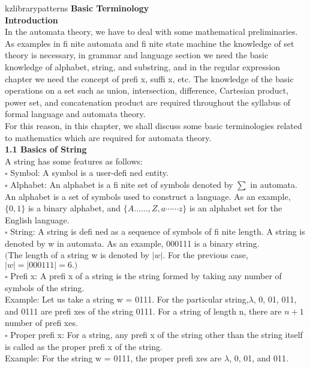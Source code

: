 \documentclass[12pt,a4paper]{book}
\begin{document}
\setlength{\parskip}{5mm}kzlibrary{patterns}
\textbf{\large{Basic Terminology}} \\
\textbf{Introduction} \\
In the automata theory, we have to deal with some mathematical preliminaries. As examples in fi nite
automata and fi nite state machine the knowledge of set theory is necessary, in grammar and language
section we need the basic knowledge of alphabet, string, and substring, and in the regular expression
chapter we need the concept of prefi x, suffi x, etc. The knowledge of the basic operations on a set such
as union, intersection, difference, Cartesian product, power set, and concatenation product are required
throughout the syllabus of formal language and automata theory.\\
For this reason, in this chapter, we shall discuss some basic terminologies related to mathematics
which are required for automata theory.\\
\textbf{1.1 Basics of String}\\ 
A string has some features as follows:\\
$\square$ Symbol: A symbol is a user-defi ned entity.\\
$\square$ Alphabet: An alphabet is a fi nite set of symbols denoted by $\sum$ in automata. An alphabet is a set of
symbols used to construct a language. As an example, $\{0, 1\}$ is a binary alphabet, and $\{A……, Z,
a\cdots\cdots z\}$ is an alphabet set for the English language.\\
$\square$ String: A string is defi ned as a sequence of symbols of fi nite length. A string is denoted by w in
automata. As an example, 000111 is a binary string.\\
$($The length of a string w is denoted by $|w|$. For the previous case, $|w| = |000111| = 6.)$\\
$\square$ Prefi x: A prefi x of a string is the string formed by taking any number of symbols of the string.\\
Example: Let us take a string w = 0111. For the particular string,$\lambda$, 0, 01, 011, and 0111 are prefi xes
of the string 0111. For a string of length n, there are $n + 1$ number of prefi xes.\\
$\square$ Proper prefi x: For a string, any prefi x of the string other than the string itself is called as the proper
prefi x of the string.\\
Example: For the string w = 0111, the proper prefi xes are $\lambda$, 0, 01, and 011.\\
\end{document}
